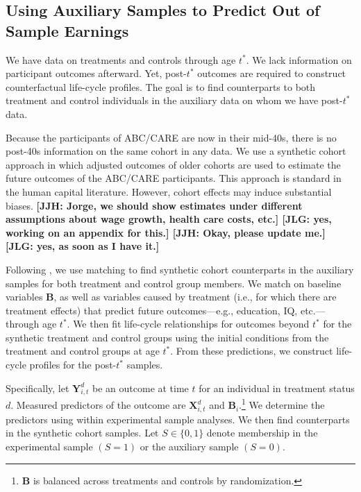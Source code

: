 \subsection{Using Auxiliary Samples to Predict Out of Sample Earnings}\label{sec:necrosis}

We have data on treatments and controls through age $t^{\ast}$. We lack information on participant outcomes afterward. Yet, post-$t^{\ast}$ outcomes are required to construct counterfactual life-cycle profiles. The goal is to find counterparts to both treatment and control individuals in the auxiliary data on whom we have post-$t^{\ast}$ data.

Because the participants of ABC/CARE are now in their mid-40s, there is no post-40s information on the same cohort  in any data. We use a synthetic cohort approach in which adjusted outcomes of older cohorts are used to estimate the future outcomes of the ABC/CARE participants. This approach is standard in the human capital literature. However, cohort effects may induce substantial biases. \textbf{[JJH: Jorge, we should show estimates under different assumptions about wage growth, health care costs, etc.] [JLG: yes, working on an appendix for this.] [JJH: Okay, please update me.] [JLG: yes, as soon as I have it.]}

Following \citet{Heckman_Ichimura_etal_1998_REStud}, we use matching to find synthetic cohort counterparts in the auxiliary samples for both treatment and control group members. We match on baseline variables $\bm{B}$, as well as variables caused by treatment (i.e., for which there are treatment effects) that predict future outcomes---e.g., education, IQ, etc.---through age $t^{\ast}$. We then fit life-cycle relationships for outcomes beyond $t^{\ast}$ for the synthetic treatment and control groups using the initial conditions from the treatment and control groups at age $t^{\ast}$. From these predictions, we construct life-cycle profiles for the post-$t^*$ samples.

Specifically, let $\bm{Y}^{d}_{i,t}$ be an outcome at time $t$ for an individual in treatment status $d$. Measured predictors of the outcome are $\bm{X}^{d}_{i,t}$ and $\bm{B}_i$.\footnote{$\bm{B}$ is balanced across treatments and controls by randomization.} We determine the predictors using within experimental sample analyses. We then find counterparts in the synthetic cohort samples. Let $S \in \{ 0,1\}$ denote membership in the experimental sample $(S=1)$ or the auxiliary sample $(S=0)$.

